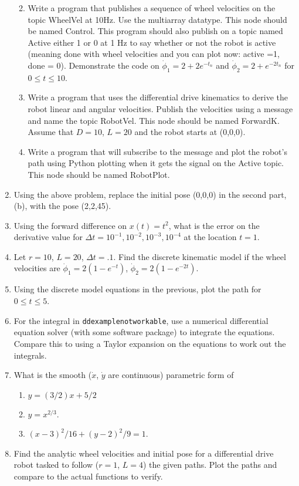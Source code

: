 \begin{enumerate}
  \begin{enumerate}
  \def\labelenumii{\alph{enumii}.}
  \tightlist
  \item
    Write a program that publishes a sequence of wheel velocities on the
    topic {WheelVel} at 10Hz. Use the multiarray datatype. This node
    should be named {Control}. This program should also publish on a
    topic named {Active} either 1 or 0 at 1 Hz to say whether or not the
    robot is active (meaning done with wheel velocities and you can plot
    now: active =1, done = 0). Demonstrate the code on
    \(\dot{\phi}_1 = 2 + 2e^{-t_n}\) and \(\dot{\phi}_2 = 2+e^{-2t_n}\)
    for \(0 \leq t \leq 10\).
  \item
    Write a program that uses the differential drive kinematics to
    derive the robot linear and angular velocities. Publish the
    velocities using a message and name the topic {RobotVel}. This node
    should be named {ForwardK}. Assume that \(D=10\), \(L=20\) and the
    robot starts at (0,0,0).
  \item
    Write a program that will subscribe to the message and plot the
    robot's path using Python plotting when it gets the signal on the
    Active topic. This node should be named {RobotPlot}.
  \end{enumerate}
\item
  Using the above problem, replace the initial pose (0,0,0) in the
  second part, (b), with the pose (2,2,45).
\item
  Using the forward difference on \(x(t) = t^2\), what is the error on
  the derivative value for
  \(\Delta t  = 10^{-1}, 10^{-2}, 10^{-3}, 10^{-4}\) at the location
  \(t=1\).
\item
  Let \(r=10\), \(L=20\), \(\Delta t = .1\). Find the discrete kinematic
  model if the wheel velocities are \(\dot{\phi}_{1} = 2(1-e^{-t})\),
  \(\dot{\phi}_{2} = 2(1-e^{-2t})\).
\item
  Using the discrete model equations in the previous, plot the path for
  \(0 \leq t \leq 5\).
\item
  For the integral in \texttt{ddexamplenotworkable}, use a numerical
  differential equation solver (with some software package) to integrate
  the equations. Compare this to using a Taylor expansion on the
  equations to work out the integrals.
\item
  What is the smooth (\(\dot{x}\), \(\dot{y}\) are continuous)
  parametric form of

  \begin{enumerate}
  \def\labelenumii{\alph{enumii}.}
  \tightlist
  \item
    \(y=(3/2)x + 5/2\)
  \item
    \(y = x^{2/3}\).
  \item
    \((x-3)^2/16 + (y-2)^2/9 = 1\).
  \end{enumerate}
\item
  Find the analytic wheel velocities and initial pose for a differential
  drive robot tasked to follow (\(r=1\), \(L=4\)) the given paths. Plot
  the paths and compare to the actual functions to verify.


\end{enumerate}
